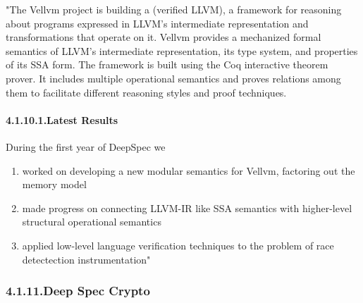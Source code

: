 \documentclass[12pt,twoside]{article}
\begin{document}
\noindent{}"The Vellvm project is building a (verified LLVM), a framework for
reasoning about programs expressed in LLVM's intermediate
representation and transformations that operate on it. Vellvm provides
a mechanized formal semantics of LLVM's intermediate representation,
its type system, and properties of its SSA form. The framework is
built using the Coq interactive theorem prover. It includes multiple
operational semantics and proves relations among them to facilitate
different reasoning styles and proof techniques.%

\paragraph{4.1.10.1.\hspace*{0.5em}Latest Results}\label{sec-latest-results}%

\noindent{}During the first year of DeepSpec we%

\begin{enumerate}%

\item{}
worked on developing a new modular semantics for Vellvm, factoring out the memory model%

\item{}
made progress on connecting LLVM-IR like SSA semantics with higher-level structural operational semantics%

\item{}
applied low-level language verification techniques to the problem of race detectection instrumentation"%
\end{enumerate}%

\subsubsection{4.1.11.\hspace*{0.5em}Deep Spec Crypto}\label{sec-deep-spec-crypto}%
\end{document}
